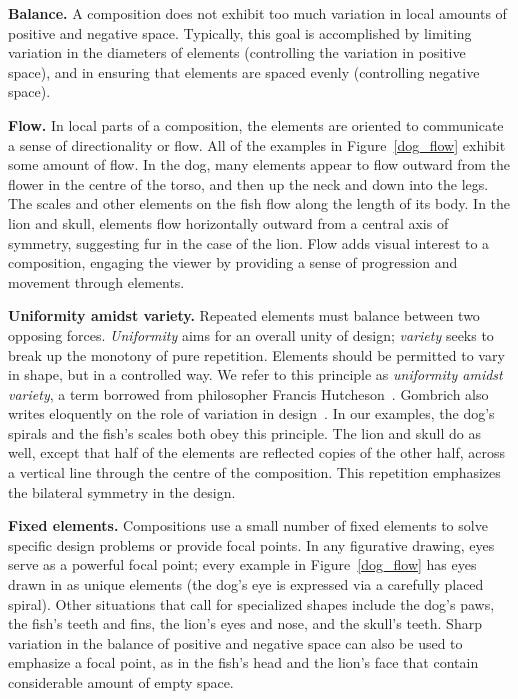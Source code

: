 \begin{items}%
\item \textbf{Balance.} A composition does not exhibit too
  much variation in local amounts of positive and negative space.
  Typically, this goal is accomplished by limiting variation in 
  the diameters of elements (controlling the variation in
  positive space), and in ensuring that elements are spaced 
  evenly (controlling negative space).

\item \textbf{Flow.} In local parts of a composition, the elements
  are oriented to communicate a sense of directionality or flow.
  All of the examples in Figure~\ref{dog_flow} exhibit 
  some amount of flow.  In the dog, many elements appear to flow
  outward from the flower in the centre of the torso, and then
  up the neck and down into the legs.  The scales and other elements
  on the fish flow along the length of its body.  In the lion and skull,
  elements flow horizontally outward from a central axis of symmetry,
  suggesting fur in the case of the lion.  Flow
  adds visual interest to a composition, engaging the viewer 
  by providing a sense of progression and movement through elements.

\item \textbf{Uniformity amidst variety.} Repeated elements must balance
  between two opposing forces.  \textit{Uniformity} 
  aims for an overall unity of design; \textit{variety}
  seeks to break up the monotony of
  pure repetition.  Elements should be permitted to vary in shape,
  but in a controlled way.  We refer to this principle
  as \textit{uniformity amidst variety}, a term borrowed from 
  philosopher Francis Hutcheson~\cite{Hutcheson1729}.
  Gombrich also writes eloquently on the role of variation in 
  design~\cite{Gombrich}.
  In our examples, the dog's spirals and the
  fish's scales both obey this principle.  The lion and skull do as well,
  except that half of the elements are reflected copies of the other
  half, across a vertical line through the centre of the composition.
  This repetition emphasizes the bilateral symmetry in the design.

\item \textbf{Fixed elements.} Compositions use a small number of fixed
  elements to solve specific design problems or provide focal points.
  In any figurative drawing, eyes serve as a powerful focal point;
  every example in Figure~\ref{dog_flow} has eyes drawn
  in as unique elements
  (the dog's eye is expressed via a carefully placed spiral).  Other
  situations that call for specialized shapes include the dog's paws,
  the fish's teeth and fins, 
  the lion's eyes and nose, %
  and the skull's teeth.
  Sharp variation in the balance of positive and negative space
  can also be used to emphasize a focal point,
  as in the fish's head and the lion's face that contain considerable amount of empty space.


\end{items}

